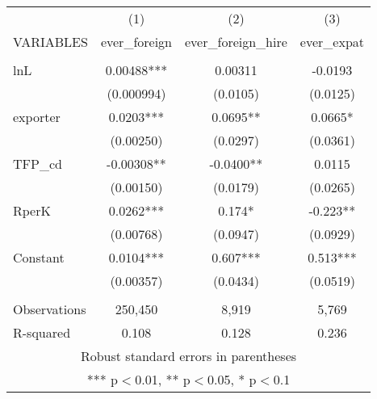 \begin{tabular}{lccc} \hline
 & (1) & (2) & (3) \\
VARIABLES & ever\_foreign & ever\_foreign\_hire & ever\_expat \\ \hline
 &  &  &  \\
lnL & 0.00488*** & 0.00311 & -0.0193 \\
 & (0.000994) & (0.0105) & (0.0125) \\
exporter & 0.0203*** & 0.0695** & 0.0665* \\
 & (0.00250) & (0.0297) & (0.0361) \\
TFP\_cd & -0.00308** & -0.0400** & 0.0115 \\
 & (0.00150) & (0.0179) & (0.0265) \\
RperK & 0.0262*** & 0.174* & -0.223** \\
 & (0.00768) & (0.0947) & (0.0929) \\
Constant & 0.0104*** & 0.607*** & 0.513*** \\
 & (0.00357) & (0.0434) & (0.0519) \\
 &  &  &  \\
Observations & 250,450 & 8,919 & 5,769 \\
 R-squared & 0.108 & 0.128 & 0.236 \\ \hline
\multicolumn{4}{c}{ Robust standard errors in parentheses} \\
\multicolumn{4}{c}{ *** p$<$0.01, ** p$<$0.05, * p$<$0.1} \\
\end{tabular}
